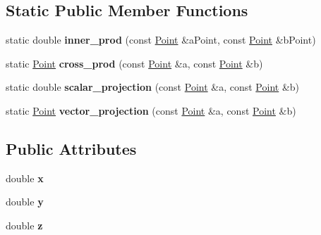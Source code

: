 \subsection*{Static Public Member Functions}
\begin{DoxyCompactItemize}
\item 
\hypertarget{classcpcr_1_1Point_a7d772183814e327af7598e4cc2012721}{static double {\bfseries inner\-\_\-prod} (const \hyperlink{classcpcr_1_1Point}{Point} \&a\-Point, const \hyperlink{classcpcr_1_1Point}{Point} \&b\-Point)}\label{classcpcr_1_1Point_a7d772183814e327af7598e4cc2012721}

\item 
\hypertarget{classcpcr_1_1Point_af592d7e51cce62d1babed5de97b43e69}{static \hyperlink{classcpcr_1_1Point}{Point} {\bfseries cross\-\_\-prod} (const \hyperlink{classcpcr_1_1Point}{Point} \&a, const \hyperlink{classcpcr_1_1Point}{Point} \&b)}\label{classcpcr_1_1Point_af592d7e51cce62d1babed5de97b43e69}

\item 
\hypertarget{classcpcr_1_1Point_a4c5486276fbf5a4d634d5d20b381c04e}{static double {\bfseries scalar\-\_\-projection} (const \hyperlink{classcpcr_1_1Point}{Point} \&a, const \hyperlink{classcpcr_1_1Point}{Point} \&b)}\label{classcpcr_1_1Point_a4c5486276fbf5a4d634d5d20b381c04e}

\item 
\hypertarget{classcpcr_1_1Point_a6c76a72df55e4dc884c746114b9cc43b}{static \hyperlink{classcpcr_1_1Point}{Point} {\bfseries vector\-\_\-projection} (const \hyperlink{classcpcr_1_1Point}{Point} \&a, const \hyperlink{classcpcr_1_1Point}{Point} \&b)}\label{classcpcr_1_1Point_a6c76a72df55e4dc884c746114b9cc43b}

\end{DoxyCompactItemize}
\subsection*{Public Attributes}
\begin{DoxyCompactItemize}
\item 
\hypertarget{classcpcr_1_1Point_a10b516b8c941a39a2e3292cfb7226578}{double {\bfseries x}}\label{classcpcr_1_1Point_a10b516b8c941a39a2e3292cfb7226578}

\item 
\hypertarget{classcpcr_1_1Point_a11fad9d9b998bd29ed7dd43ae70d8446}{double {\bfseries y}}\label{classcpcr_1_1Point_a11fad9d9b998bd29ed7dd43ae70d8446}

\item 
\hypertarget{classcpcr_1_1Point_ac70d54598a9813206e5f7e7ba57756ff}{double {\bfseries z}}\label{classcpcr_1_1Point_ac70d54598a9813206e5f7e7ba57756ff}

\end{DoxyCompactItemize}


